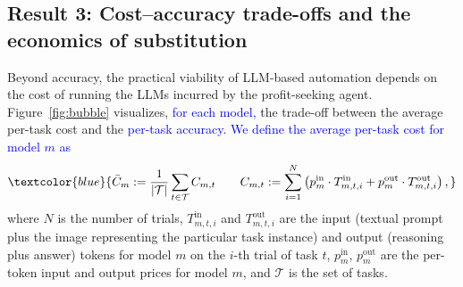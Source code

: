 \documentclass[12pt,a4paper]{article}
\newcommand{\blue}[1]{\textcolor{blue}{#1}}
\newcommand{\SC}[1]{\textcolor{violet}{SC: #1}}
\begin{document}


\subsection{Result 3: Cost–accuracy trade-offs and the economics of substitution}
\label{sec:cost-accuracy}

Beyond accuracy, the practical viability of LLM-based automation depends on the cost of running the LLMs incurred by the profit-seeking agent. Figure~\ref{fig:bubble} visualizes, \blue{for each model,} the trade-off between the average per-task cost and the \blue{per-task accuracy. We define the average per-task cost for model $m$ as}
$$
\blue{\bar{C}_m := \frac{1}{|\mathcal{T}|} \sum_{t \in \mathcal{T}} C_{m,t} \qquad C_{m,t} := \sum_{i=1}^{N} \left( p_m^{\text{in}} \cdot T_{m,t,i}^{\text{in}} + p_m^{\text{out}} \cdot T_{m,t,i}^{\text{out}} \right),}
$$
where $N$ is the number of trials, $T_{m,t,i}^{\text{in}}$ and $T_{m,t,i}^{\text{out}}$ are the input (textual prompt plus the image representing the particular task instance) and output (reasoning plus answer) tokens for model $m$ on the $i$-th trial of task $t$, $p_m^{\text{in}}$, $p_m^{\text{out}}$ are the per-token input and output prices for model $m$, and $\mathcal{T}$ is the set of tasks.
\end{document}
